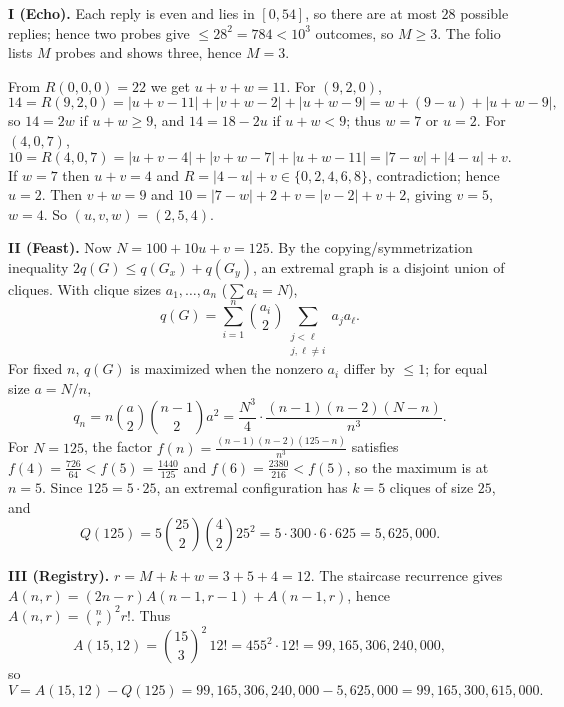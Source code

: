 \SolutionPage
\small

\textbf{I (Echo).}
Each reply is even and lies in \([0,54]\), so there are at most \(28\) possible replies; hence two probes give
\(\le 28^2=784<10^3\) outcomes, so \(M\ge 3\). The folio lists \(M\) probes and shows three, hence \(M=3\).

From \(R(0,0,0)=22\) we get \(u+v+w=11\).
For \((9,2,0)\),
\[
14=R(9,2,0)=|u{+}v{-}11|+|v{+}w{-}2|+|u{+}w{-}9|
= w+(9-u)+|u+w-9|,
\]
so \(14=2w\) if \(u+w\ge 9\), and \(14=18-2u\) if \(u+w<9\); thus \(w=7\) or \(u=2\).
For \((4,0,7)\),
\[
10=R(4,0,7)=|u{+}v{-}4|+|v{+}w{-}7|+|u{+}w{-}11|
=|7-w|+|4-u|+v.
\]
If \(w=7\) then \(u+v=4\) and \(R=|4-u|+v\in\{0,2,4,6,8\}\), contradiction; hence \(u=2\).
Then \(v+w=9\) and \(10=|7-w|+2+v=|v-2|+v+2\), giving \(v=5\), \(w=4\).
So \((u,v,w)=(2,5,4)\).

\medskip
\textbf{II (Feast).}
Now \(N=100+10u+v=125\).
By the copying/symmetrization inequality \(2q(G)\le q(G_x)+q(G_y)\), an extremal graph is a disjoint union of cliques.
With clique sizes \(a_1,\dots,a_n\) (\(\sum a_i=N\)),
\[
q(G)=\sum_{i=1}^n \binom{a_i}{2}\sum_{\substack{j<\ell\\ j,\ell\neq i}} a_j a_\ell.
\]
For fixed \(n\), \(q(G)\) is maximized when the nonzero \(a_i\) differ by \(\le 1\); for equal size \(a=N/n\),
\[
q_n=n\binom{a}{2}\binom{n-1}{2}a^2=\frac{N^3}{4}\cdot \frac{(n-1)(n-2)(N-n)}{n^3}.
\]
For \(N=125\), the factor \(f(n)=\frac{(n-1)(n-2)(125-n)}{n^3}\) satisfies
\(f(4)=\frac{726}{64}<f(5)=\frac{1440}{125}\) and \(f(6)=\frac{2380}{216}<f(5)\), so the maximum is at \(n=5\).
Since \(125=5\cdot 25\), an extremal configuration has \(k=5\) cliques of size \(25\), and
\[
Q(125)=5\binom{25}{2}\binom{4}{2}25^2=5\cdot 300\cdot 6\cdot 625=5{,}625{,}000.
\]

\medskip
\textbf{III (Registry).}
\(r=M+k+w=3+5+4=12\).
The staircase recurrence gives \(A(n,r)=(2n-r)A(n-1,r-1)+A(n-1,r)\), hence \(A(n,r)=\binom{n}{r}^2 r!\).
Thus
\[
A(15,12)=\binom{15}{3}^2\,12!=455^2\cdot 12!=99{,}165{,}306{,}240{,}000,
\]
so
\[
V=A(15,12)-Q(125)=99{,}165{,}306{,}240{,}000-5{,}625{,}000
=99{,}165{,}300{,}615{,}000.
\]

\normalsize{}
\NextPage
